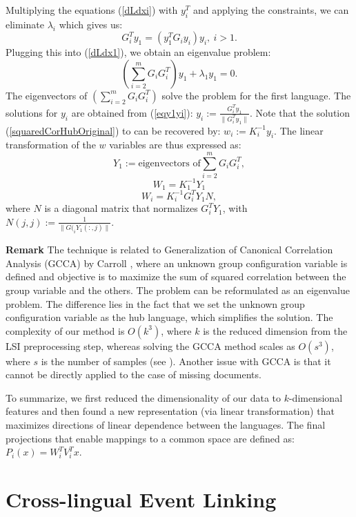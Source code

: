 \documentclass[twoside,11pt]{article}
\begin{document}
Multiplying the equations (\ref{dLdxi}) with $y_i^T$ and applying the constraints, we can eliminate $\lambda_i$ which gives us:
\begin{equation}\label{eqy1yi}
G_{i}^T y_1 = \left(y_1^T G_{i} y_i \right) y_i,~i > 1.
\end{equation}
Plugging this into (\ref{dLdx1}), we obtain an eigenvalue problem:
$$\left( \sum_{i = 2}^m G_i G_{i}^T \right) y_1 + \lambda_1 y_1 = 0.$$
The eigenvectors of $\left( \sum_{i = 2}^m G_i G_{i}^T \right)$ solve the problem for the first language. The solutions for $y_i$ are obtained from (\ref{eqy1yi}): $y_i := \frac{G_{i}^T y_1}{\| G_{i}^T y_1 \|}$.
Note that the solution (\ref{squaredCorHubOriginal}) to can be recovered by: $w_i := K_i^{-1} y_i$. The linear transformation of the $w$ variables are thus expressed as:
$$ Y_1 := \text{eigenvectors of} \sum_{i = 2}^m G_i G_{i}^T, $$
$$ W_1 = K_1^{-1} Y_1 $$
$$ W_i = K_i^{-1} G_{i}^T Y_1 N,$$
where $N$ is a diagonal matrix that normalizes $G_{i}^T Y_1$, with $N(j,j) := \frac{1}{\|G(_{i} Y_1(:,j)\|}$.

\textbf{Remark}
 The technique is related to  Generalization of Canonical Correlation Analysis (GCCA) by Carroll \citeyear{Carroll}, where an unknown group configuration variable is defined and objective is to maximize the sum of squared correlation between the group variable and the others. The problem can be reformulated as an eigenvalue problem. The difference lies in the fact that we set the unknown group configuration variable as the hub language, which simplifies the solution. The complexity of our method is $O(k^3)$, where $k$ is the reduced dimension from the LSI preprocessing step, whereas solving the GCCA method scales as $O(s^3)$, where $s$ is the number of samples (see \cite{gifi}). Another issue with GCCA is that it cannot be directly applied to the case of missing documents.

To summarize, we first reduced the dimensionality of our data to $k$-dimensional features and then found a new representation (via linear transformation) that maximizes directions of linear dependence between the languages. The final projections that enable mappings to a common space are defined as: $P_i(x) = W_i^T V_i^T x.$


\section{Cross-lingual Event Linking}\label{sec:linking}
\end{document}
